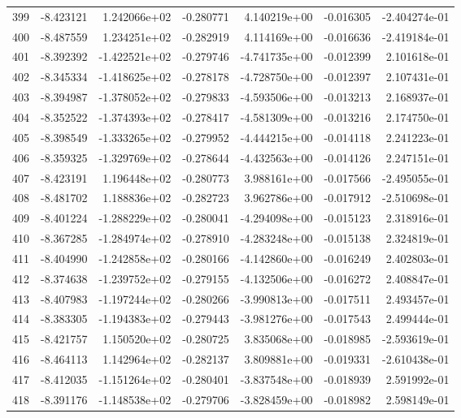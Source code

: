 \begin{tabular}{rrrrrrr}
 399 &  -8.423121 &  1.242066e+02 & -0.280771 &  4.140219e+00 &  -0.016305 & -2.404274e-01 \\
 400 &  -8.487559 &  1.234251e+02 & -0.282919 &  4.114169e+00 &  -0.016636 & -2.419184e-01 \\
 401 &  -8.392392 & -1.422521e+02 & -0.279746 & -4.741735e+00 &  -0.012399 &  2.101618e-01 \\
 402 &  -8.345334 & -1.418625e+02 & -0.278178 & -4.728750e+00 &  -0.012397 &  2.107431e-01 \\
 403 &  -8.394987 & -1.378052e+02 & -0.279833 & -4.593506e+00 &  -0.013213 &  2.168937e-01 \\
 404 &  -8.352522 & -1.374393e+02 & -0.278417 & -4.581309e+00 &  -0.013216 &  2.174750e-01 \\
 405 &  -8.398549 & -1.333265e+02 & -0.279952 & -4.444215e+00 &  -0.014118 &  2.241223e-01 \\
 406 &  -8.359325 & -1.329769e+02 & -0.278644 & -4.432563e+00 &  -0.014126 &  2.247151e-01 \\
 407 &  -8.423191 &  1.196448e+02 & -0.280773 &  3.988161e+00 &  -0.017566 & -2.495055e-01 \\
 408 &  -8.481702 &  1.188836e+02 & -0.282723 &  3.962786e+00 &  -0.017912 & -2.510698e-01 \\
 409 &  -8.401224 & -1.288229e+02 & -0.280041 & -4.294098e+00 &  -0.015123 &  2.318916e-01 \\
 410 &  -8.367285 & -1.284974e+02 & -0.278910 & -4.283248e+00 &  -0.015138 &  2.324819e-01 \\
 411 &  -8.404990 & -1.242858e+02 & -0.280166 & -4.142860e+00 &  -0.016249 &  2.402803e-01 \\
 412 &  -8.374638 & -1.239752e+02 & -0.279155 & -4.132506e+00 &  -0.016272 &  2.408847e-01 \\
 413 &  -8.407983 & -1.197244e+02 & -0.280266 & -3.990813e+00 &  -0.017511 &  2.493457e-01 \\
 414 &  -8.383305 & -1.194383e+02 & -0.279443 & -3.981276e+00 &  -0.017543 &  2.499444e-01 \\
 415 &  -8.421757 &  1.150520e+02 & -0.280725 &  3.835068e+00 &  -0.018985 & -2.593619e-01 \\
 416 &  -8.464113 &  1.142964e+02 & -0.282137 &  3.809881e+00 &  -0.019331 & -2.610438e-01 \\
 417 &  -8.412035 & -1.151264e+02 & -0.280401 & -3.837548e+00 &  -0.018939 &  2.591992e-01 \\
 418 &  -8.391176 & -1.148538e+02 & -0.279706 & -3.828459e+00 &  -0.018982 &  2.598149e-01 \\

\end{tabular}
